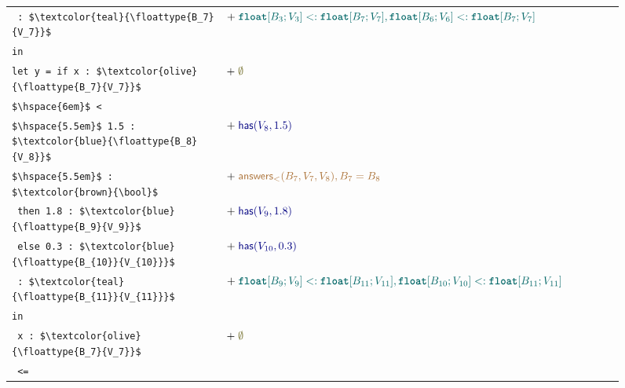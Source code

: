 \begin{figure}[t]
{\begin{tabular}{p{0.35\linewidth} p{0.7\linewidth}}
    \lstinline[style=mystyle]| : $\textcolor{teal}{\floattype{B_7}{V_7}}$ | 
      & $+\; \textcolor{teal}{\subtype{\floattype{B_3}{V_3}}{\floattype{B_7}{V_7}}, \subtype{\floattype{B_6}{V_6}}{\floattype{B_7}{V_7}}}$ \\
    
    \lstinline[style=mystyle]|in| 
      & \\
    
    \lstinline[style=mystyle]|let y = if x : $\textcolor{olive}{\floattype{B_7}{V_7}}$ | 
      & $+\; \textcolor{olive}{\emptyset}$ \\

    \lstinline[style=mystyle]|$\hspace{6em}$ <| 
      & \\

    \lstinline[style=mystyle]|$\hspace{5.5em}$ 1.5 : $\textcolor{blue}{\floattype{B_8}{V_8}}$| 
      & $+\; \textcolor{blue}{\has{V_8}{1.5}}$ \\

    \lstinline[style=mystyle]|$\hspace{5.5em}$ : $\textcolor{brown}{\bool}$| 
      & $+\; \textcolor{brown}{\answerslt{B_7}{V_7}{V_8}, B_7 = B_8}$ \\
    
    \lstinline[style=mystyle]| then 1.8 : $\textcolor{blue}{\floattype{B_9}{V_9}}$| 
      & $+\; \textcolor{blue}{\has{V_9}{1.8}}$ \\
    
    \lstinline[style=mystyle]| else 0.3 : $\textcolor{blue}{\floattype{B_{10}}{V_{10}}}$| 
      & $+\; \textcolor{blue}{\has{V_{10}}{0.3}}$ \\

    \lstinline[style=mystyle]| : $\textcolor{teal}{\floattype{B_{11}}{V_{11}}}$| 
      & $+\; \textcolor{teal}{\subtype{\floattype{B_9}{V_9}}{\floattype{B_{11}}{V_{11}}}, \subtype{\floattype{B_{10}}{V_{10}}}{\floattype{B_{11}}{V_{11}}}}$ \\
    
    \lstinline[style=mystyle]|in| 
      & \\
    
    \lstinline[style=mystyle]| x : $\textcolor{olive}{\floattype{B_7}{V_7}}$| 
      & $+\; \textcolor{olive}{\emptyset}$  \\

    \lstinline[style=mystyle]| <=| 
      & \\


\end{tabular}}
\end{figure}
